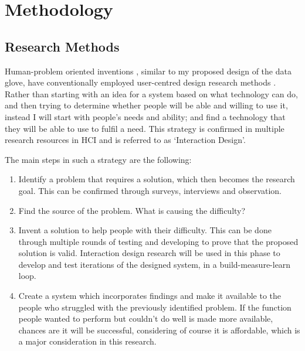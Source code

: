 \chapter{Methodology}

\section{Research Methods}\label{chap:researchmethods}

Human-problem oriented inventions \parencite{Cox2008} , similar to my proposed design of the data glove, have conventionally employed user-centred design research methods \parencite{Bevan1999}. Rather than starting with an idea for a system based on what technology can do, and then trying to determine whether people will be able and willing to use it, instead I will start with people's needs and ability; and find a technology that they will be able to use to fulfil a need. This strategy is confirmed in multiple research resources in HCI \parencite{Dix2004} and is referred to as ‘Interaction Design’.

The main steps in such a strategy are the following: 

\begin{enumerate}
    \item Identify a problem that requires a solution, which then becomes the research goal. This can be confirmed through surveys, interviews and observation. 
    \item Find the source of the problem. What is causing the difficulty?
    \item Invent a solution to help people with their difficulty. This can be done through multiple rounds of testing and developing to prove that the proposed solution is valid. Interaction design research will be used in this phase to develop and test iterations of the designed system, in a build-measure-learn loop.
    \item Create a system which incorporates findings and make it available to the people who struggled with the previously identified problem. If the function people wanted to perform but couldn't do well is made more available, chances are it will be successful, considering of course it is affordable, which is a major consideration in this research.
\end{enumerate}

